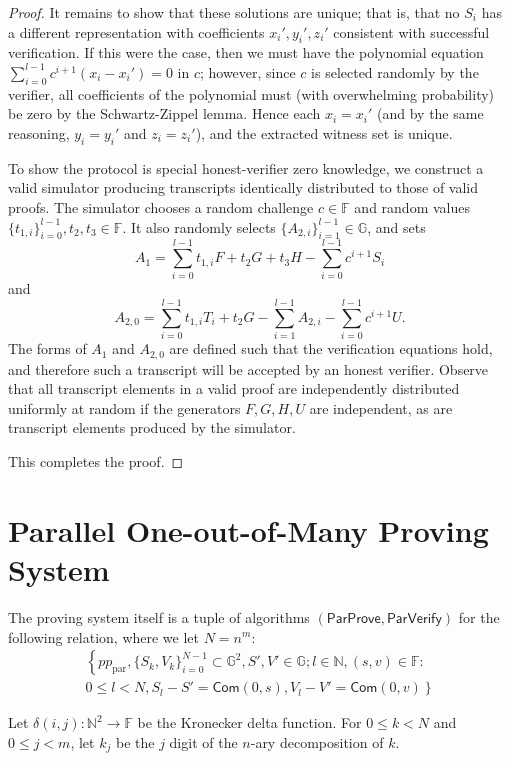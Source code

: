 \documentclass{llncs}
\newcommand{\G}{\mathbb{G}}
\newcommand{\F}{\mathbb{F}}
\newcommand{\func}[1]{\mathsf{#1}}
\newcommand{\com}{\func{Com}}
\begin{document}
\begin{proof}
It remains to show that these solutions are unique; that is, that no $S_i$ has a different representation with coefficients $x_i',y_i',z_i'$ consistent with successful verification.
If this were the case, then we must have the polynomial equation $\sum_{i=0}^{l-1} c^{i+1}(x_i - x_i') = 0$ in $c$; however, since $c$ is selected randomly by the verifier, all coefficients of the polynomial must (with overwhelming probability) be zero by the Schwartz-Zippel lemma.
Hence each $x_i = x_i'$ (and by the same reasoning, $y_i = y_i'$ and $z_i = z_i'$), and the extracted witness set is unique.

To show the protocol is special honest-verifier zero knowledge, we construct a valid simulator producing transcripts identically distributed to those of valid proofs.
The simulator chooses a random challenge $c \in \F$ and random values $\{t_{1,i}\}_{i=0}^{l-1}, t_2, t_3 \in \F$.
It also randomly selects $\{A_{2,i}\}_{i=1}^{l-1} \in \G$, and sets $$A_1 = \sum_{i=0}^{l-1} t_{1,i} F + t_2 G + t_3 H - \sum_{i=0}^{l-1} c^{i+1} S_i$$ and $$A_{2,0} = \sum_{i=0}^{l-1} t_{1,i} T_i + t_2 G - \sum_{i=1}^{l-1} A_{2,i} -  \sum_{i=0}^{l-1} c^{i+1} U.$$
The forms of $A_1$ and $A_{2,0}$ are defined such that the verification equations hold, and therefore such a transcript will be accepted by an honest verifier.
Observe that all transcript elements in a valid proof are independently distributed uniformly at random if the generators $F,G,H,U$ are independent, as are transcript elements produced by the simulator.

This completes the proof.
\end{proof}


\section{Parallel One-out-of-Many Proving System}
\label{app:parallel}

The proving system itself is a tuple of algorithms $(\func{ParProve},\func{ParVerify})$ for the following relation, where we let $N = n^m$:
\begin{multline*}
\left\{ pp_{\text{par}}, \{S_k,V_k\}_{i=0}^{N-1} \subset \G^2, S',V' \in \G ; l \in \mathbb{N}, (s,v) \in \F : \right. \\
\left. 0 \leq l < N, S_l - S' = \com(0,s), V_l - V' = \com(0,v) \right\}
\end{multline*}

Let $\delta(i,j): \mathbb{N}^2 \to \F$ be the Kronecker delta function.
For $0 \leq k < N$ and $0 \leq j < m$, let $k_j$ be the $j$ digit of the $n$-ary decomposition of $k$.
\end{document}
